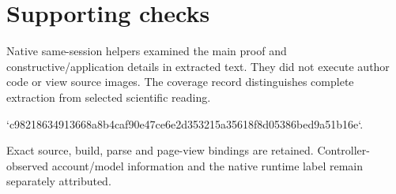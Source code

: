 \documentclass[10pt]{article}
\begin{document}
\section*{Supporting checks}
Native same-session helpers examined the main proof and constructive/application details in extracted text. They did not execute author code or view source images. The coverage record distinguishes complete extraction from selected scientific reading.\par
`c98218634913668a8b4caf90e47ce6e2d353215a35618f8d05386bed9a51b16e`.\par
Exact source, build, parse and page-view bindings are retained. Controller-observed account/model information and the native runtime label remain separately attributed.\par
\end{document}
